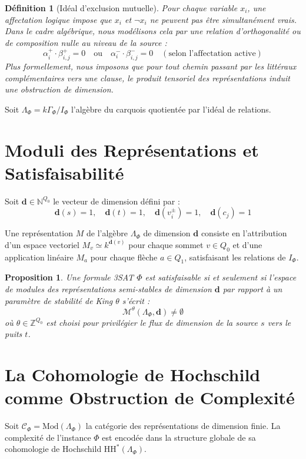 \documentclass[11pt,a4paper]{article}
\newtheorem{proposition}[theorem]{Proposition}
\newtheorem{definition}[theorem]{Définition}
\begin{document}
\begin{definition}[Idéal d'exclusion mutuelle]
Pour chaque variable $x_i$, une affectation logique impose que $x_i$ et $\neg x_i$ ne peuvent pas être simultanément vrais. Dans le cadre algébrique, nous modélisons cela par une relation d'orthogonalité ou de composition nulle au niveau de la source :
$$ \alpha_i^+ \cdot \beta_{i,j}^+ = 0 \quad \text{ou} \quad \alpha_i^- \cdot \beta_{i,j}^- = 0 \quad (\text{selon l'affectation active}) $$
Plus formellement, nous imposons que pour tout chemin passant par les littéraux complémentaires vers une clause, le produit tensoriel des représentations induit une obstruction de dimension.
\end{definition}

Soit $\Lambda_{\Phi} = k\Gamma_{\Phi}/I_{\Phi}$ l'algèbre du carquois quotientée par l'idéal de relations.

\section{Moduli des Représentations et Satisfaisabilité}
Soit $\mathbf{d} \in \mathbb{N}^{Q_0}$ le vecteur de dimension défini par :
$$ \mathbf{d}(s) = 1, \quad \mathbf{d}(t) = 1, \quad \mathbf{d}(v_i^{\pm}) = 1, \quad \mathbf{d}(c_j) = 1 $$

Une représentation $M$ de l'algèbre $\Lambda_{\Phi}$ de dimension $\mathbf{d}$ consiste en l'attribution d'un espace vectoriel $M_v \simeq k^{\mathbf{d}(v)}$ pour chaque sommet $v \in Q_0$ et d'une application linéaire $M_a$ pour chaque flèche $a \in Q_1$, satisfaisant les relations de $I_{\Phi}$.

\begin{proposition}
Une formule 3SAT $\Phi$ est satisfaisable si et seulement si l'espace de modules des représentations semi-stables de dimension $\mathbf{d}$ par rapport à un paramètre de stabilité de King $\theta$ s'écrit :
$$ \mathcal{M}^{\theta}(\Lambda_{\Phi}, \mathbf{d}) \neq \emptyset $$
où $\theta \in \mathbb{Z}^{Q_0}$ est choisi pour privilégier le flux de dimension de la source $s$ vers le puits $t$.
\end{proposition}

\section{La Cohomologie de Hochschild comme Obstruction de Complexité}
Soit $\mathcal{C}_{\Phi} = \mathrm{Mod}(\Lambda_{\Phi})$ la catégorie des représentations de dimension finie. La complexité de l'instance $\Phi$ est encodée dans la structure globale de sa cohomologie de Hochschild $\mathrm{HH}^*(\Lambda_{\Phi})$.
\end{document}
